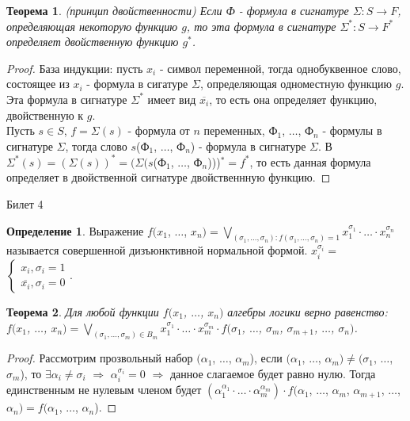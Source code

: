 \documentclass[a4paper, 12pt]{article}
\theoremstyle{definition}
\newtheorem*{definition}{Определение}
\theoremstyle{plain}
\newtheorem*{theorem}{Теорема}
\theoremstyle{remark}
\begin{document}
  \begin{theorem}(принцип двойственности)
    Если Ф - формула в сигнатуре $\Sigma: S\to F$, определяющая некоторую функцию $g$, то эта формула в сигнатуре $\Sigma^*: S\to F^*$ определяет двойственную функцию $g^*$.
  \end{theorem}
  \begin{proof}
    База индукции: пусть $x_i$ - символ переменной, тогда однобуквенное слово, состоящее из $x_i$ - формула в сигатуре $\Sigma$, определяющая одноместную функцию $g$. Эта формула в сигнатуре $\Sigma^*$ имеет вид $\overline{x_i}$, то есть она определяет функцию, двойственную к $g$.\\
    Пусть $s\in S$, $f=\Sigma(s)$ - формула от $n$ переменных, Ф$_1$, $\ldots$, Ф$_n$ - формулы в сигнатуре $\Sigma$, тогда слово $s$(Ф$_1$, $\ldots$, Ф$_n$) - формула в сигнатуре $\Sigma$. В $\Sigma^*(s)=(\Sigma(s))^*=(\Sigma(s$(Ф$_1$, $\ldots$, Ф$_n$)))$^*=f^*$, то есть данная формула определяет в двойственной сигнатуре двойственнную функцию.
  \end{proof}
  \begin{center}
    Билет 4
  \end{center}
  \begin{definition}
    Выражение $f(x_1$, $\ldots$, $x_n)=\bigvee\limits_{(\sigma_1, \ldots,\sigma_n):f(\sigma_1, \ldots,\sigma_n)=1}x_1^{\sigma_1}\cdot\ldots\cdot x_n^{\sigma_n}$ называется совершенной дизъюнктивной нормальной формой. $x_i^{\sigma_i}=$
    $\begin{cases}
      x_i,\sigma_i=1\\
      \overline{x_i},\sigma_i=0
    \end{cases}$.
  \end{definition}
  \begin{theorem}
    Для любой функции $f(x_1$, $\ldots$, $x_n)$ алгебры логики верно равенство:\\
    $f(x_1$, $\ldots$, $x_n)=\bigvee\limits_{(\sigma_1, \ldots,\sigma_m)\in B_m}x_1^{\sigma_1}\cdot\ldots\cdot x_m^{\sigma_m}\cdot f(\sigma_1$, $\ldots$, $\sigma_m$, $\sigma_{m+1}$, $\ldots$, $\sigma_n)$.
  \end{theorem}
  \begin{proof}
    Рассмотрим прозвольный набор $(\alpha_1$, $\ldots$, $\alpha_m$), если $(\alpha_1$, $\ldots$, $\alpha_m)\neq(\sigma_1$, $\ldots$, $\sigma_m$), то $\exists \alpha_i\neq\sigma_i$ $\Longrightarrow$ $\alpha_i^{\sigma_i}=0$ $\Longrightarrow$ данное слагаемое будет равно нулю. Тогда единственным не нулевым членом будет $(\alpha_1^{\alpha_1}\cdot\ldots\cdot\alpha_m^{\alpha_m})\cdot f(\alpha_1$, $\ldots$, $\alpha_m$, $\alpha_{m+1}$, $\ldots$, $\alpha_n)=f(\alpha_1$, $\ldots$, $\alpha_n$).
  \end{proof}
\end{document}
